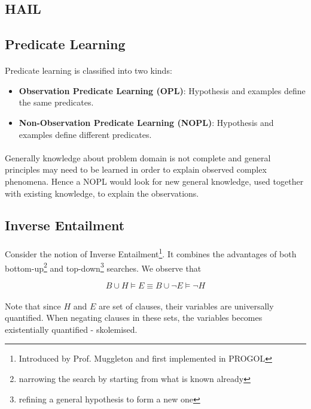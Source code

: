 \documentclass{article}
\theoremstyle{plain}
\theoremstyle{definition}
\begin{document}
\begin{multicols}{2}
\section{HAIL}

\subsection{Predicate Learning}

\paragraph{} Predicate learning is classified into two kinds:

\begin{itemize}
\item \textbf{Observation Predicate Learning (OPL)}: Hypothesis and examples define the same predicates. 
\item \textbf{Non-Observation Predicate Learning (NOPL)}: Hypothesis and examples define different predicates.
\end{itemize}

\paragraph{} Generally knowledge about problem domain is not complete and general principles may need to be learned in order to explain observed complex phenomena. Hence a NOPL would look for new general knowledge, used together with existing knowledge, to explain the observations. 

\subsection{Inverse Entailment}

\paragraph{} Consider the notion of Inverse Entailment\footnote{Introduced by Prof. Muggleton and first implemented in PROGOL}. It combines the advantages of both bottom-up\footnote{narrowing the search by starting from what is known already} and top-down\footnote{refining a general hypothesis to form a new one} searches. We observe that

\[ B \cup H \models E \equiv B \cup \lnot E \models \lnot H \]

\paragraph{} Note that since $H$ and $E$ are set of clauses, their variables are universally quantified. When negating clauses in these sets, the variables becomes existentially quantified - skolemised. 


\end{multicols}
\end{document}
